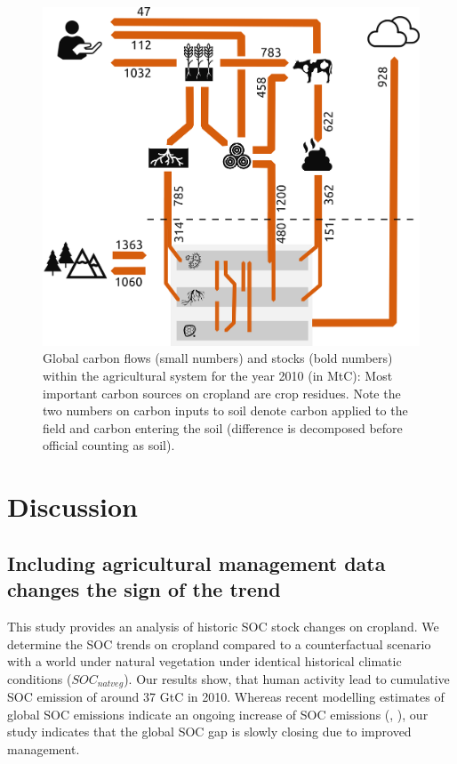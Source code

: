 \documentclass[gc, manuscript]{copernicus}
\begin{document}
\begin{figure}[H]
\includegraphics[width=16cm]{../ResultNotebooks/Output/Images/OuFlowFig} \caption{Global carbon flows (small numbers) and stocks (bold numbers) within the agricultural system for the year 2010 (in MtC): Most important carbon sources on cropland are crop residues. Note the two numbers on carbon inputs to soil denote carbon applied to the field and carbon entering the soil (difference is decomposed before official counting as soil).}\label{fig:FlowFig}
\end{figure}

\newpage

\newpage

\hypertarget{discussion}{%
\section{Discussion}\label{discussion}}

\hypertarget{including-agricultural-management-data-changes-the-sign-of-the-trend}{%
\subsection{Including agricultural management data changes the sign of the trend}\label{including-agricultural-management-data-changes-the-sign-of-the-trend}}

This study provides an analysis of historic SOC stock changes on cropland. We determine the SOC trends on cropland compared to a counterfactual scenario with a world under natural vegetation under identical historical climatic conditions (\(SOC_{natveg}\)). Our results show, that human activity lead to cumulative SOC emission of around 37 GtC in 2010. Whereas recent modelling estimates of global SOC emissions indicate an ongoing increase of SOC emissions (\citep{pugh_simulated_2015}, \citep{sanderman_soil_2017}), our study indicates that the global SOC gap is slowly closing due to improved management.
\end{document}
